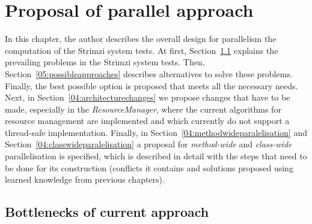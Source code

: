\chapter{Proposal of parallel approach}
\label{04:chapter:title}

In this chapter, the author describes the overall design for parallelism the computation of the Strimzi system tests.
At first, Section~\ref{05:bottlenecks} explains the prevailing problems in the Strimzi system tests.
Then, Section~\ref{05:possibleapproaches} describes alternatives to solve these problems.
Finally, the best possible option is proposed that meets all the necessary needs.
Next, in Section~\ref{04:architecturechanges} we propose changes that have to be made, especially in the \emph{ResourceManager}, where the current algorithms for resource management are implemented and which currently do not support a thread-safe implementation.
Finally, in Section~\ref{04:methodwideparalelisation} and Section~\ref{04:classwideparalelisation} a proposal for \emph{method-wide} and \emph{class-wide} parallelisation is specified, which is described in detail with the steps that need to be done for its construction (conflicts it contains and solutions proposed using learned knowledge from previous chapters).

\section{Bottlenecks of current approach}
\label{05:bottlenecks}


